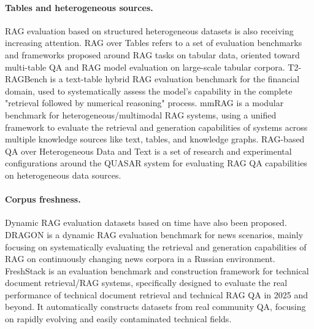 \paragraph{Tables and heterogeneous sources.}
RAG evaluation based on structured heterogeneous datasets is also receiving increasing attention. RAG over Tables \cite{ragovertables2025} refers to a set of evaluation benchmarks and frameworks proposed around RAG tasks on tabular data, oriented toward multi-table QA and RAG model evaluation on large-scale tabular corpora. T2-RAGBench \cite{t2ragbench2025} is a text-table hybrid RAG evaluation benchmark for the financial domain, used to systematically assess the model's capability in the complete "retrieval followed by numerical reasoning" process. mmRAG \cite{mmrag2025} is a modular benchmark for heterogeneous/multimodal RAG systems, using a unified framework to evaluate the retrieval and generation capabilities of systems across multiple knowledge sources like text, tables, and knowledge graphs. RAG-based QA over Heterogeneous Data and Text \cite{raghetero2024} is a set of research and experimental configurations around the QUASAR system for evaluating RAG QA capabilities on heterogeneous data sources.

\paragraph{Corpus freshness.}
Dynamic RAG evaluation datasets based on time have also been proposed. DRAGON \cite{dragon2024} is a dynamic RAG evaluation benchmark for news scenarios, mainly focusing on systematically evaluating the retrieval and generation capabilities of RAG on continuously changing news corpora in a Russian environment. FreshStack \cite{freshstack2025} is an evaluation benchmark and construction framework for technical document retrieval/RAG systems, specifically designed to evaluate the real performance of technical document retrieval and technical RAG QA in 2025 and beyond. It automatically constructs datasets from real community QA, focusing on rapidly evolving and easily contaminated technical fields.


